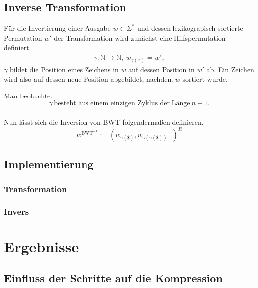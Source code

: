 \documentclass{article}
\begin{document}
\subsection{Inverse Transformation}
Für die Invertierung einer Ausgabe $w\in\Sigma^*$ und dessen lexikograpisch sortierte Permutation $w'$ der Transformation wird zunächst eine Hilfspermutation definiert.
\begin{equation}
\begin{split}
    \gamma:\mathbb{N}\rightarrow\mathbb{N},~w_{\gamma(x)}=w'_x
\end{split}
\end{equation}
$\gamma$ bildet die Position eines Zeichens in $w$ auf dessen Position in $w'$ ab. Ein Zeichen wird also auf dessen neue Position abgebildet, nachdem $w$ sortiert wurde.

Man beobachte: 
\begin{equation}
    \gamma~\text{besteht aus einem einzigen Zyklus der Länge}~n+1.
\end{equation}
\\[.5cm]
Nun lässt sich die Inversion von BWT folgendermaßen definieren.
\begin{equation}
    w^{\text{BWT}^{-1}}:=(w_{\gamma(\$)},w_{\gamma(\gamma(\$)),..})^R
\end{equation}
\subsection{Implementierung}
\subsubsection{Transformation}

\subsubsection{Invers}

\newpage
\section{Ergebnisse}
\subsection{Einfluss der Schritte auf die Kompression}
\printbibliography[heading=bibintoc]
\end{document}

